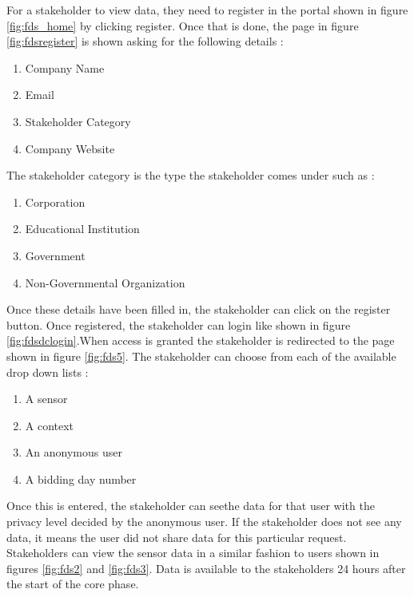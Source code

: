 For a stakeholder to view data, they need to register in the portal shown in figure \ref{fig:fds_home} by clicking register. Once that is done,
the page in figure \ref{fig:fdsregister} is shown asking for the following details :

\begin{enumerate}
    \item Company Name
    \item Email
    \item Stakeholder Category
    \item Company Website
\end{enumerate}

The stakeholder category is the type the stakeholder comes under such as :

\begin{enumerate}
    \item Corporation
    \item Educational Institution
    \item Government
    \item Non-Governmental Organization
\end{enumerate}


Once these details have been filled in, the stakeholder can click on the register button. Once registered, the stakeholder can login like shown in figure \ref{fig:fdsdclogin}.When access is granted the stakeholder is redirected to the page shown in figure \ref{fig:fds5}. The stakeholder can choose from each of the available drop down lists :
\begin{enumerate}
    \item A sensor
    \item A context
    \item An anonymous user
    \item A bidding day number
\end{enumerate}

Once this is entered, the stakeholder can seethe  data for that user with the privacy level decided by the anonymous user. If the stakeholder does not see any data, it means the user did not share data for this particular request. Stakeholders can view the sensor data in a similar fashion to users shown in figures \ref{fig:fds2} and \ref{fig:fds3}. Data is available to the stakeholders 24 hours after the start of the core phase.


